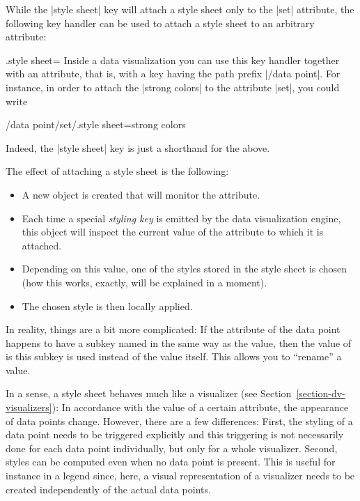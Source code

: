 While the |style sheet| key will attach a style sheet only to the
|set| attribute, the following key handler can be used to attach a
style sheet to an arbitrary attribute:


\begin{handler}{{.style sheet}=}
  Inside a data visualization you can use this key handler together
  with an attribute, that is, with a key having the path prefix
  |/data point|. For instance, in order to attach the  |strong colors| to the attribute |set|, you could write
\begin{codeexample}
/data point/set/.style sheet=strong colors    
\end{codeexample}
  Indeed, the |style sheet| key is just a shorthand for the above.

  The effect of attaching a style sheet is the following:
  \begin{itemize}
  \item A new object is created that will monitor the attribute.
  \item Each time a special \emph{styling key} is emitted by the data
    visualization engine, this object will inspect the current value
    of the attribute to which it is attached.
  \item Depending on this value, one of the styles stored in the style
    sheet is chosen (how this works, exactly, will be explained in a
    moment).
  \item The chosen style is then locally applied.
  \end{itemize}
  
  In reality, things are a bit more complicated: If the attribute of
  the data point happens to have a subkey named in the same way as the
  value, then the value of is this subkey is used instead of the value
  itself. This allows you to ``rename'' a value.
  
  In a sense, a style sheet behaves much like a visualizer (see
  Section~\ref{section-dv-visualizers}): In accordance with the value
  of a certain attribute, the appearance of data points
  change. However, there are a few differences: First, the styling of
  a data point needs to be triggered explicitly and this triggering is
  not necessarily done for each data point individually, but only for
  a whole visualizer. Second, styles can be computed even when no data
  point is present. This is useful for instance in a legend since,
  here, a visual representation of a visualizer needs to be created
  independently of the actual data points.
\end{handler}

